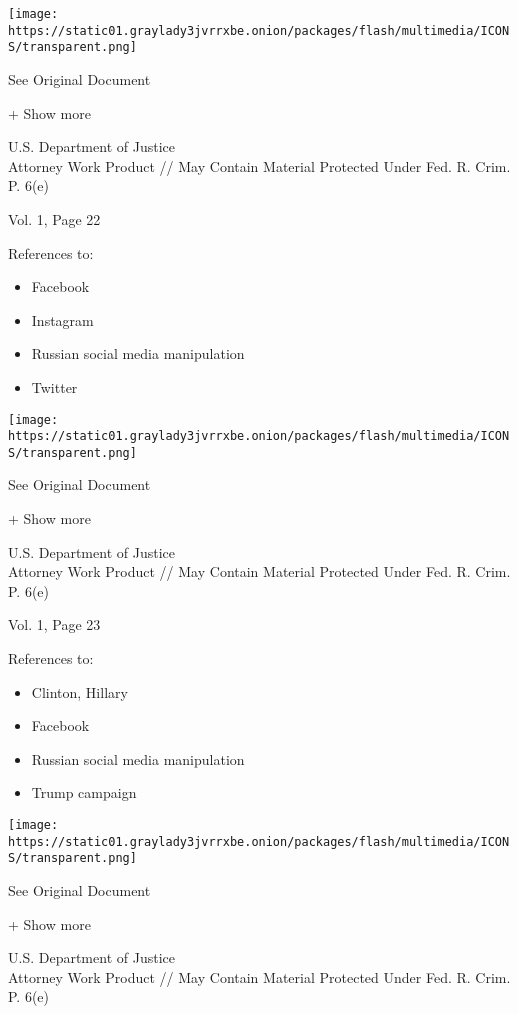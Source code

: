 \protect\hyperlink{}{}

\texttt{[image: https://static01.graylady3jvrrxbe.onion/packages/flash/multimedia/ICONS/transparent.png]}

See Original Document

+ Show more

U.S. Department of Justice\\
Attorney Work Product // May Contain Material Protected Under Fed. R.
Crim. P. 6(e)

Vol. 1, Page 22

References to:

\begin{itemize}
\tightlist
\item
  Facebook
\item
  Instagram
\item
  Russian social media manipulation
\item
  Twitter
\end{itemize}

\protect\hyperlink{}{}

\texttt{[image: https://static01.graylady3jvrrxbe.onion/packages/flash/multimedia/ICONS/transparent.png]}

See Original Document

+ Show more

U.S. Department of Justice\\
Attorney Work Product // May Contain Material Protected Under Fed. R.
Crim. P. 6(e)

Vol. 1, Page 23

References to:

\begin{itemize}
\tightlist
\item
  Clinton, Hillary
\item
  Facebook
\item
  Russian social media manipulation
\item
  Trump campaign
\end{itemize}

\protect\hyperlink{}{}

\texttt{[image: https://static01.graylady3jvrrxbe.onion/packages/flash/multimedia/ICONS/transparent.png]}

See Original Document

+ Show more

U.S. Department of Justice\\
Attorney Work Product // May Contain Material Protected Under Fed. R.
Crim. P. 6(e)

